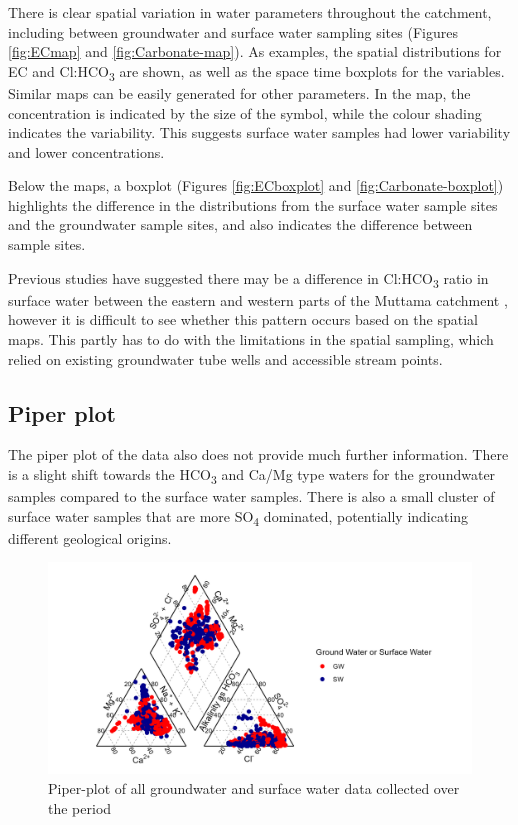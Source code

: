 \documentclass[, manuscript]{copernicus}
\begin{document}
There is clear spatial variation in water parameters throughout the
catchment, including between groundwater and surface water sampling
sites (Figures \ref{fig:ECmap} and \ref{fig:Carbonate-map}). As
examples, the spatial distributions for EC and Cl:HCO\textsubscript{3}
are shown, as well as the space time boxplots for the variables. Similar
maps can be easily generated for other parameters. In the map, the
concentration is indicated by the size of the symbol, while the colour
shading indicates the variability. This suggests surface water samples
had lower variability and lower concentrations.

Below the maps, a boxplot (Figures \ref{fig:ECboxplot} and
\ref{fig:Carbonate-boxplot}) highlights the difference in the
distributions from the surface water sample sites and the groundwater
sample sites, and also indicates the difference between sample sites.

Previous studies have suggested there may be a difference in
Cl:HCO\textsubscript{3} ratio in surface water between the eastern and
western parts of the Muttama catchment \citep{Conyers2008}, however it
is difficult to see whether this pattern occurs based on the spatial
maps. This partly has to do with the limitations in the spatial
sampling, which relied on existing groundwater tube wells and accessible
stream points.

\subsection{Piper plot}

The piper plot of the data also does not provide much further
information. There is a slight shift towards the HCO\textsubscript{3}
and Ca/Mg type waters for the groundwater samples compared to the
surface water samples. There is also a small cluster of surface water
samples that are more SO\textsubscript{4} dominated, potentially
indicating different geological origins.

\begin{figure}
\includegraphics[width=0.8\linewidth]{Figures/piper_plot} \caption{Piper-plot of all groundwater and surface water data collected over the period}\label{fig:piperplot}
\end{figure}
\end{document}
